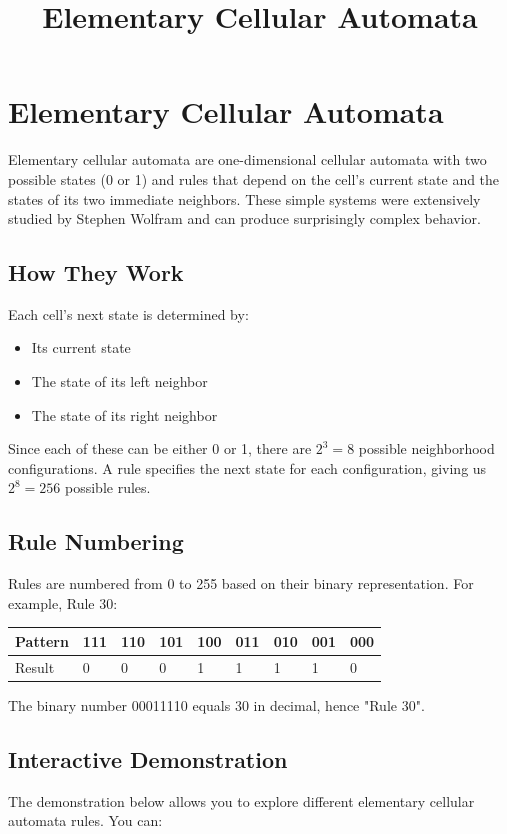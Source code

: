 \documentclass{article}
\title{Elementary Cellular Automata}
\begin{document}
\section{Elementary Cellular Automata}

Elementary cellular automata are one-dimensional cellular automata with two possible states (0 or 1) and rules that depend on the cell's current state and the states of its two immediate neighbors. These simple systems were extensively studied by Stephen Wolfram and can produce surprisingly complex behavior.

\subsection{How They Work}

Each cell's next state is determined by:

\begin{itemize}
\item Its current state
\item The state of its left neighbor
\item The state of its right neighbor
\end{itemize}

Since each of these can be either 0 or 1, there are $2^3 = 8$ possible neighborhood configurations. A rule specifies the next state for each configuration, giving us $2^8 = 256$ possible rules.

\subsection{Rule Numbering}

Rules are numbered from 0 to 255 based on their binary representation. For example, Rule 30:

\begin{tabular}{lllllllll}
Pattern & 111 & 110 & 101 & 100 & 011 & 010 & 001 & 000 \\
\hline
Result & 0 & 0 & 0 & 1 & 1 & 1 & 1 & 0 \\
\end{tabular}

The binary number 00011110 equals 30 in decimal, hence "Rule 30".

\subsection{Interactive Demonstration}

The demonstration below allows you to explore different elementary cellular automata rules. You can:
\end{document}
